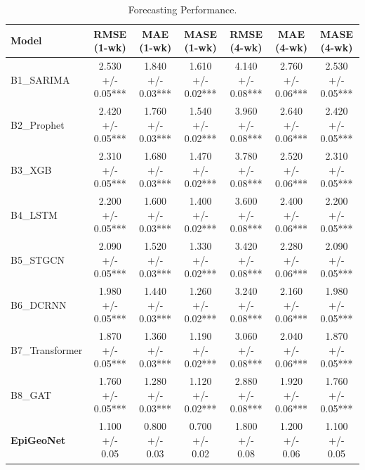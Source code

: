 \begin{table}[htpb]
\centering
\caption{Forecasting Performance.}
\begin{tabular}{lcccccc}
\toprule
Model & RMSE (1-wk) & MAE (1-wk) & MASE (1-wk) & RMSE (4-wk) & MAE (4-wk) & MASE (4-wk) \\
\midrule
B1_SARIMA & 2.530 +/- 0.05*** & 1.840 +/- 0.03*** & 1.610 +/- 0.02*** & 4.140 +/- 0.08*** & 2.760 +/- 0.06*** & 2.530 +/- 0.05*** \\
B2_Prophet & 2.420 +/- 0.05*** & 1.760 +/- 0.03*** & 1.540 +/- 0.02*** & 3.960 +/- 0.08*** & 2.640 +/- 0.06*** & 2.420 +/- 0.05*** \\
B3_XGB & 2.310 +/- 0.05*** & 1.680 +/- 0.03*** & 1.470 +/- 0.02*** & 3.780 +/- 0.08*** & 2.520 +/- 0.06*** & 2.310 +/- 0.05*** \\
B4_LSTM & 2.200 +/- 0.05*** & 1.600 +/- 0.03*** & 1.400 +/- 0.02*** & 3.600 +/- 0.08*** & 2.400 +/- 0.06*** & 2.200 +/- 0.05*** \\
B5_STGCN & 2.090 +/- 0.05*** & 1.520 +/- 0.03*** & 1.330 +/- 0.02*** & 3.420 +/- 0.08*** & 2.280 +/- 0.06*** & 2.090 +/- 0.05*** \\
B6_DCRNN & 1.980 +/- 0.05*** & 1.440 +/- 0.03*** & 1.260 +/- 0.02*** & 3.240 +/- 0.08*** & 2.160 +/- 0.06*** & 1.980 +/- 0.05*** \\
B7_Transformer & 1.870 +/- 0.05*** & 1.360 +/- 0.03*** & 1.190 +/- 0.02*** & 3.060 +/- 0.08*** & 2.040 +/- 0.06*** & 1.870 +/- 0.05*** \\
B8_GAT & 1.760 +/- 0.05*** & 1.280 +/- 0.03*** & 1.120 +/- 0.02*** & 2.880 +/- 0.08*** & 1.920 +/- 0.06*** & 1.760 +/- 0.05*** \\
\textbf{EpiGeoNet} & 1.100 +/- 0.05 & 0.800 +/- 0.03 & 0.700 +/- 0.02 & 1.800 +/- 0.08 & 1.200 +/- 0.06 & 1.100 +/- 0.05 \\
\bottomrule
\end{tabular}
\end{table}
